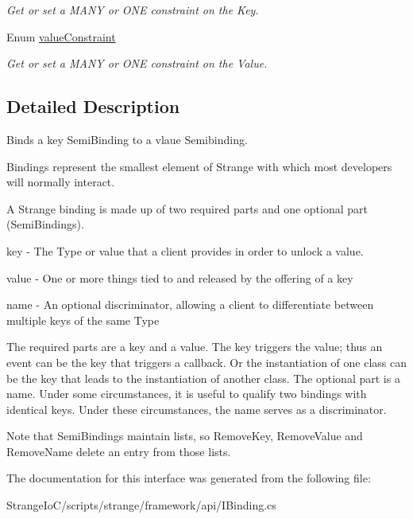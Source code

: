 \begin{DoxyCompactItemize}
\begin{DoxyCompactList}\small\item\em Get or set a M\-A\-N\-Y or O\-N\-E constraint on the Key. \end{DoxyCompactList}\item 
\hypertarget{interfacestrange_1_1framework_1_1api_1_1_i_binding_a83c99f79ce6adda2811ff2e9c4fb2ff2}{Enum \hyperlink{interfacestrange_1_1framework_1_1api_1_1_i_binding_a83c99f79ce6adda2811ff2e9c4fb2ff2}{value\-Constraint}}\label{interfacestrange_1_1framework_1_1api_1_1_i_binding_a83c99f79ce6adda2811ff2e9c4fb2ff2}

\begin{DoxyCompactList}\small\item\em Get or set a M\-A\-N\-Y or O\-N\-E constraint on the Value. \end{DoxyCompactList}\end{DoxyCompactItemize}


\subsection{Detailed Description}
Binds a key Semi\-Binding to a vlaue Semibinding. 

Bindings represent the smallest element of Strange with which most developers will normally interact.

A Strange binding is made up of two required parts and one optional part (Semi\-Bindings). 
\begin{DoxyItemize}
\item key -\/ The Type or value that a client provides in order to unlock a value. 
\item value -\/ One or more things tied to and released by the offering of a key 
\item name -\/ An optional discriminator, allowing a client to differentiate between multiple keys of the same Type 
\end{DoxyItemize}

The required parts are a key and a value. The key triggers the value; thus an event can be the key that triggers a callback. Or the instantiation of one class can be the key that leads to the instantiation of another class. The optional part is a name. Under some circumstances, it is useful to qualify two bindings with identical keys. Under these circumstances, the name serves as a discriminator. \par
 \par
 Note that Semi\-Bindings maintain lists, so Remove\-Key, Remove\-Value and Remove\-Name delete an entry from those lists. 

The documentation for this interface was generated from the following file\-:\begin{DoxyCompactItemize}
\item 
Strange\-Io\-C/scripts/strange/framework/api/I\-Binding.\-cs\end{DoxyCompactItemize}
